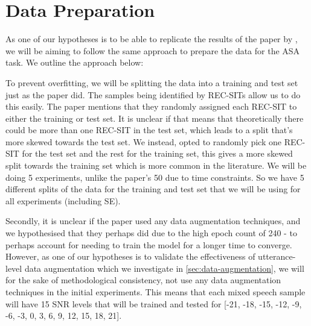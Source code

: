 \documentclass[logo,bsc,singlespacing,parskip,online]{infthesis}
\begin{document}
\section{Data Preparation}
\label{sec:data-preparation}
As one of our hypotheses is to be able to replicate the results of the paper by \citet{Huwel2020HearDS}, 
we will be aiming to follow the same approach to prepare the data for the ASA task.
We outline the approach below:

To prevent overfitting, we will be splitting the data into a training and test set just as the paper did.
The samples being identified by REC-SITs allow us to do this easily. The paper mentions that they randomly 
assigned each REC-SIT to either the training or test set. It is unclear if 
that means that theoretically there could be more than one REC-SIT in the test set, which 
leads to a split that's more skewed towards the test set. We instead, opted to randomly pick 
one REC-SIT for the test set and the rest for the training set, this gives a more 
skewed split towards the training set which is more common in the literature.
We will be doing 5 experiments, unlike the paper's 50 due to time constraints. So 
we have 5 different splits of the data for the training and test set that we will be using 
for all experiments (including SE).

Secondly, it is unclear if the paper used any data augmentation techniques, and we 
hypothesised that they perhaps did due to the high epoch count of 240 - to perhaps 
account for needing to train the model for a longer time to converge. However,
as one of our hypotheses is to validate the effectiveness of utterance-level data 
augmentation which we investigate in \ref{sec:data-augmentation}, we will 
for the sake of methodological consistency, not use any data augmentation techniques in the 
initial experiments. This means that each mixed speech sample will have 15
SNR levels that will be trained and tested for [-21, -18, -15, -12, -9, -6, -3, 0, 3, 6, 9, 12, 15, 18, 21].
\end{document}
